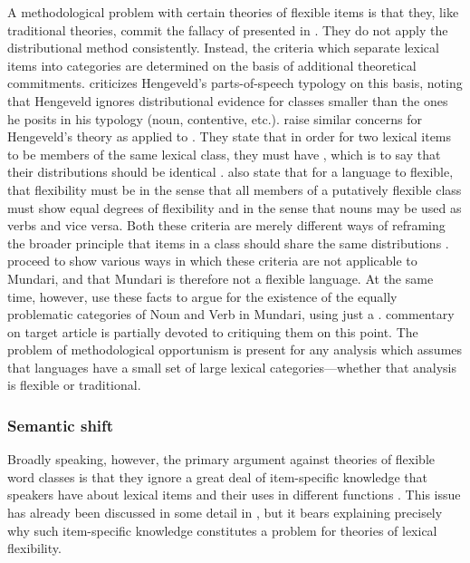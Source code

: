 A methodological problem with certain theories of flexible items is that they, like traditional theories, commit the fallacy of  \parencite[30, 41]{Croft2001b} presented in . They do not apply the distributional method consistently. Instead, the criteria which separate lexical items into categories are determined on the basis of additional theoretical commitments. \textcite[§2.2.2]{Croft2001b} criticizes Hengeveld's parts-of-speech typology on this basis, noting that Hengeveld ignores distributional evidence for classes smaller than the ones he posits in his typology (noun, contentive, etc.). \textcite{EvansOsada2005} raise similar concerns for Hengeveld's theory as applied to . They state that in order for two lexical items to be members of the same lexical class, they must have , which is to say that their distributions should be identical \parencite[366]{EvansOsada2005}. \citeauthor{EvansOsada2005} also state that for a language to flexible, that flexibility must be  in the sense that all members of a putatively flexible class must show equal degrees of flexibility and  in the sense that nouns may be used as verbs and vice versa. Both these criteria are merely different ways of reframing the broader principle that items in a class should share the same distributions \parencite[434]{Croft2005}. \citeauthor{EvansOsada2005} proceed to show various ways in which these criteria are not applicable to Mundari, and that Mundari is therefore not a flexible language. At the same time, however, \citeauthor{EvansOsada2005} use these facts to argue for the existence of the equally problematic categories of Noun and Verb in Mundari, using just a .  commentary on  target article is partially devoted to critiquing them on this point. The problem of methodological opportunism is present for any analysis which assumes that languages have a small set of large lexical categories—whether that analysis is flexible or traditional.

\subsubsection{Semantic shift}
\label{sec:2.3.3.2}

Broadly speaking, however, the primary argument against theories of flexible word classes is that they ignore a great deal of item-specific knowledge that speakers have about lexical items and their uses in different functions \parencites[§3.2]{EvansOsada2005}[216]{Beck2013}. This issue has already been discussed in some detail in , but it bears explaining precisely why such item-specific knowledge constitutes a problem for theories of lexical flexibility.

